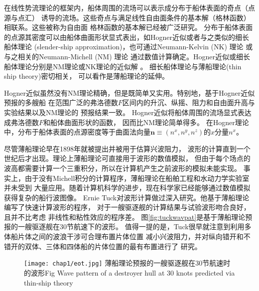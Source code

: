 在线性势流理论的框架内，船体周围的流场可以表示成分布于船体表面的奇点（点源与点汇）
诱导的流场。这些奇点与满足线性自由面条件的基本解（格林函数）相联系。这些被称为自由面
格林函数的基本解已经被广泛研究\supercite{Noblesse1981Alternative}。
分布于船体表面的点源其密度可以由船体曲面形状显式表出，如Hogner近似\supercite{Hogner1932Hydromech}或者与之类似的细长船体理论\supercite{Noblesse1983slender}
(slender-ship approximation)，也可通过Neumann-Kelvin (NK) 理论\supercite{Brard1972representation,Gueval1974distribution}
或与之相关的Neumann-Michell (NM) 理论\supercite{Noblesse2013Neumann}
通过数值计算确定。Hogner近似或细长船体理论分别是NM理论或NK理论的近似解
\supercite{Noblesse1983slender,Noblesse2013Neumann}。
细长船体理论与薄船理论\supercite{Michell1898wave}(thin ship theory)密切相关，
可以看作是薄船理论的延伸。

Hogner近似虽然没有NM理论精确，但是既简单又实用。特别地，基于Hogner近似预报的多艘船
在范围广泛的弗洛德数$F$区间内的升沉、纵摇、阻力和自由面升高与实验结果以及NM理论的
预报结果一致\supercite{Noblesse2013Neumann,Huang2013Numerical}。
Hogner近似将船体周围的流场显式表达成弗洛德数$F$和船体曲面形状的函数，
因而比NM理论简单得多。
在Hogner理论中，分布于船体表面的点源密度等于曲面法向量$\mathbf{n}\equiv(n^x,n^y,n^z)$的$x$分量$n^x$。


尽管薄船理论\supercite{Michell1898wave}早在1898年就被提出并被用于估算兴波阻力，
波形的计算直到一个世纪后才出现。理论上薄船理论可直接用于波形的数值模拟，
但由于每个场点的波高都需要计算一个三重积分，所以在计算机产生之前波形的模拟未能实现。
事实上，由于没有Michell积分的计算程序，薄船理论在船舶工程和水动力学实验室并未受到
大量应用。随着计算机科学的进步，现在科学家已经能够通过数值模拟获得复杂的船行波图像。
Ernie Tuck对波形计算做过深入研究。他基于薄船理论编写了快速计算波形的程序，
对于一艘驱逐舰的计算结果与试验波形吻合良好，且并不比考虑
非线性和粘性效应的程序差\supercite{Tuck1971ship,Tuck2001Ship}。
图\ref{fig:tuckwavpat}是基于薄船理论预报的一艘驱逐舰在30节航速下的波形。
值得一提的是，Tuck很早就注意到利用多体船片体之间的波浪干涉可合理布置片体位置
减小兴波阻力，并对纵向错开和不错开的双体、三体和四体船的片体位置的最有布置进行了
研究\supercite{Tuck1998Optimum}。

\begin{figure}[htp]
  \centering
  \captionstyle{\centering}
  \texttt{[image: chap1/eot.jpg]}
  {薄船理论预报的一艘驱逐舰在30节航速时的波形\supercite{Tuck2001Ship}}{Fig}
    {Wave pattern of a destroyer hull at 30 knots predicted via thin-ship theory}
\end{figure}

